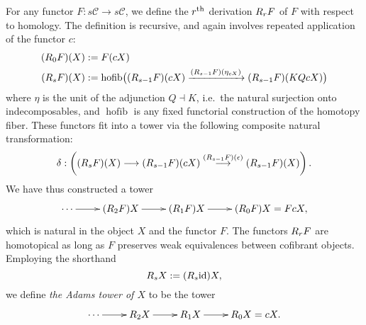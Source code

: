 \documentclass[11pt]{amsart} \renewcommand{\baselinestretch}{1.2}
\theoremstyle{plain}
\theoremstyle{definition}
\DeclareMathOperator*{\hofib}{hofib}
\renewcommand{\to}{\longrightarrow}
\newcommand{\calc}{\mathcal{C}}
\newcommand{\Id}{\mathrm{id}}
\newcommand{\algcat}{{\calc}}%
\newcommand{\dupdown}[2]{R_{\smash{#1}}}
\begin{document}
\begin{Bousfield-Kan spectral sequence}
For any functor $F:s\algcat\to s\algcat$, we define the $r^\textup{th}$ derivation $\dupdown{r}{c}F$ of $F$ with respect to  homology. The definition is recursive, and again involves repeated application of the functor $c$: 
\begin{alignat*}{2}
(\dupdown{0}{c}F)(X)
&:=
F(cX)%
\\
(\dupdown{s}{c}F)(X)
&:=
\hofib\bigl((\dupdown{s-1}{c}F)(cX)\xrightarrow{(\dupdown{s-1}{c}F)(\eta_{cX})} (\dupdown{s-1}{c}F)(KQcX)\bigr)
\end{alignat*}
where $\eta$ is the unit of the adjunction $Q\dashv K$, i.e.\ the natural surjection onto indecomposables, and $\hofib$ is any fixed  functorial construction of the homotopy fiber. These functors fit into a tower via the following composite natural transformation:
\[\delta:\left((\dupdown{s}{c}F)(X)\to (\dupdown{s-1}{c}F)(cX)\overset{(\dupdown{s-1}{c}F)(\epsilon)}{\to} (\dupdown{s-1}{c}F)(X)\right).\]
We have thus constructed a tower
\[\xymatrix@R=4mm{
\cdots 
\ar[r]
&%
(\dupdown{2}{c}F)X
\ar[r]
&%
(\dupdown{1}{c}F)X
\ar[r]&%
(\dupdown{0}{c}F)X=FcX,
}\]%
which is natural in the object $X$ and the functor $F$.
The functors $\dupdown{r}{c}F$ are homotopical as long as $F$ preserves weak equivalences between cofibrant objects. Employing the shorthand
\[\dupdown{s}{c}X:=(\dupdown{s}{c}\Id )X,\]
we define \emph{the Adams tower of $X$} to be the tower
\[\xymatrix@R=4mm{
\cdots 
\ar[r]
&%
\dupdown{2}{c}X
\ar[r]
&%
\dupdown{1}{c}X
\ar[r]&%
\dupdown{0}{c}X=cX.
}\]


\end{Bousfield-Kan spectral sequence}
\end{document}
